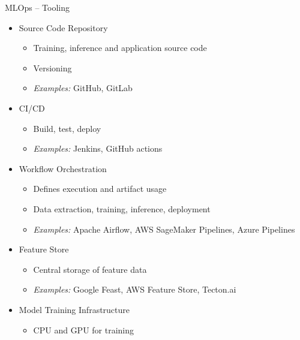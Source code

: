 \documentclass[ignorenonframetext,xcolor=x11names]{beamer}
\begin{document}
\begin{frame}{MLOps -- Tooling}
\begin{itemize}
  \item Source Code Repository
  \begin{itemize}
  \footnotesize
     \item Training, inference and application source code
     \item Versioning
     \item \emph{Examples:} GitHub, GitLab
  \end{itemize}
  \item CI/CD
  \begin{itemize}
  \footnotesize
     \item Build, test, deploy
     \item \emph{Examples:} Jenkins, GitHub actions
  \end{itemize}
  \item Workflow Orchestration
  \begin{itemize}
  \footnotesize
     \item Defines execution and artifact usage
     \item Data extraction, training, inference, deployment
     \item \emph{Examples:} Apache Airflow, AWS SageMaker Pipelines, Azure Pipelines
  \end{itemize}
  \item Feature Store
  \begin{itemize}
  \footnotesize
     \item Central storage of feature data
     \item \emph{Examples:} Google Feast, AWS Feature Store, Tecton.ai
  \end{itemize}
  \item Model Training Infrastructure
  \begin{itemize}
  \footnotesize
     \item CPU and GPU for training
  \end{itemize}
\end{itemize}
\end{frame}
\end{document}
